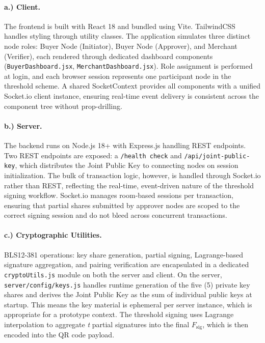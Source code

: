 \documentclass[a4paper]{scl-article}
\begin{document}
\paragraph{a.) Client.}
The frontend is built with React 18 and bundled using Vite. TailwindCSS handles styling through utility classes. The application simulates three distinct node roles: Buyer Node (Initiator), Buyer Node (Approver), and Merchant (Verifier), each rendered through dedicated dashboard components (\texttt{BuyerDashboard.jsx}, \texttt{MerchantDashboard.jsx}). Role assignment is performed at login, and each browser session represents one participant node in the threshold scheme. A shared SocketContext provides all components with a unified Socket.io client instance, ensuring real-time event delivery is consistent across the component tree without prop-drilling.


\paragraph{b.) Server.}
The backend runs on Node.js 18+ with Express.js handling REST endpoints. Two REST endpoints are exposed: a \texttt{/health check} and \texttt{/api/joint-public-key}, which distributes the Joint Public Key to connecting nodes on session initialization. The bulk of transaction logic, however, is handled through Socket.io rather than REST, reflecting the real-time, event-driven nature of the threshold signing workflow. Socket.io manages room-based sessions per transaction, ensuring that partial shares submitted by approver nodes are scoped to the correct signing session and do not bleed across concurrent transactions.


\paragraph{c.) Cryptographic Utilities.}
BLS12-381 operations: key share generation, partial signing, Lagrange-based signature aggregation, and pairing verification are encapsulated in a dedicated \texttt{cryptoUtils.js} module on both the server and client. On the server, \texttt{server/config/keys.js} handles runtime generation of the five (5) private key shares and derives the Joint Public Key as the sum of individual public keys at startup. This means the key material is ephemeral per server instance, which is appropriate for a prototype context. The threshold signing uses Lagrange interpolation to aggregate \textit{t} partial signatures into the final  $F_{\text{sig}}$, which is then encoded into the QR code payload.
\end{document}
